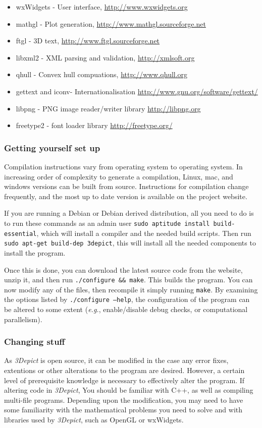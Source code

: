 \documentclass[10pt]{article}
\begin{document}
\begin{itemize}
\item wxWidgets - User interface, \url{http://www.wxwidgets.org}
\item mathgl - Plot generation, \url{http://www.mathgl.sourceforge.net}
\item ftgl -  3D text, \url{http://www.ftgl.sourceforge.net}
\item libxml2 -  XML parsing and validation, \url{http://xmlsoft.org}
\item qhull -  Convex hull compuations, \url{http://www.qhull.org}
\item gettext and iconv- Internationalisation \url{http://www.gnu.org/software/gettext/}
\item libpng - PNG image reader/writer library \url{http://libpng.org}
\item freetype2 - font loader library \url{http://freetype.org/}
\end{itemize}


\subsubsection{Getting yourself set up}
Compilation instructions vary from operating system to operating system. In increasing order of complexity to generate a compilation, Linux, mac, and windows versions can be built from source. Instructions for compilation change frequently, and the most up to date version is available on the project website.

If you are running a Debian or Debian derived distribution, all you need to do is to run these commands as an admin user \texttt{sudo aptitude install build-essential}, which will install a compiler and the needed build scripts. Then run \texttt{sudo apt-get build-dep 3depict}, this will install all the needed components to install the program.

Once this is done, you can download the latest source code from the website, unzip it, and then run \texttt{./configure \&\& make}. This builds the program. You can now modify any of the files, then recompile it simply running \texttt{make}. By examining the options listed by \texttt{./configure --help}, the configuration of the program can be altered to some extent (\emph{e.g.}, enable/disable debug checks, or computational parallelism).

\subsubsection{Changing stuff}
As \emph{3Depict} is open source, it can be modified in the case any error fixes, extentions or other alterations to the program are  desired. However, a certain level of prerequisite knowledge is necessary to effectively alter the program. If altering code in \emph{3Depict}, You should be familiar with C++, as well as compiling multi-file programs. Depending upon the modification, you may need to have some familiarity with the mathematical problems you need to solve and with libraries used by \emph{3Depict}, such as OpenGL or wxWidgets. 
\end{document}
